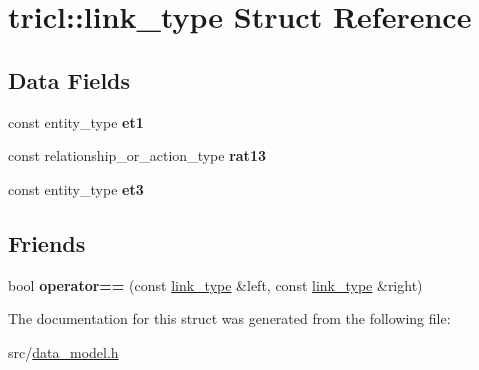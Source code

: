 \hypertarget{structtricl_1_1link__type}{}\section{tricl\+:\+:link\+\_\+type Struct Reference}
\label{structtricl_1_1link__type}
\subsection*{Data Fields}
\begin{DoxyCompactItemize}
\item 
\mbox{\label{structtricl_1_1link__type_a9cb3cda7790fc4d697f6274cf0af708c}} 
const entity\+\_\+type {\bfseries et1}
\item 
\mbox{\label{structtricl_1_1link__type_ab567b0eff4a068b28141da69c810770d}} 
const relationship\+\_\+or\+\_\+action\+\_\+type {\bfseries rat13}
\item 
\mbox{\label{structtricl_1_1link__type_ae89141e8c4719830d32c0d7fe95a184f}} 
const entity\+\_\+type {\bfseries et3}
\end{DoxyCompactItemize}
\subsection*{Friends}
\begin{DoxyCompactItemize}
\item 
\mbox{\label{structtricl_1_1link__type_ae75460e218908d70af1163248317096e}} 
bool {\bfseries operator==} (const \hyperlink{structtricl_1_1link__type}{link\+\_\+type} \&left, const \hyperlink{structtricl_1_1link__type}{link\+\_\+type} \&right)
\end{DoxyCompactItemize}


The documentation for this struct was generated from the following file\+:\begin{DoxyCompactItemize}
\item 
src/\hyperlink{data__model_8h}{data\+\_\+model.\+h}\end{DoxyCompactItemize}
